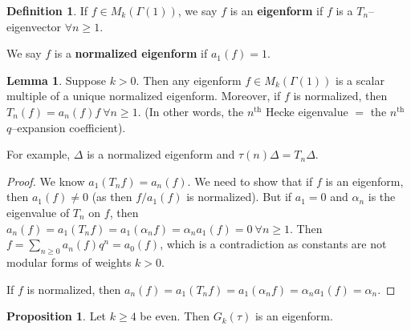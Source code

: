 \documentclass{article}
\theoremstyle{definition}
\newtheorem{lemma}[theorem]{Lemma}
\newtheorem{prop}[theorem]{Proposition}
\newtheorem{defn}{Definition}[section]
\begin{document}
\begin{defn}
    If $f \in M_k(\Gamma(1))$, we say $f$ is an \textbf{eigenform} if $f$ is a $T_n$--eigenvector $\forall n\ge 1$.
    \vspace{1mm}
     
    We say $f$ is a \textbf{normalized eigenform} if $a_1(f) = 1$.
\end{defn}
\begin{lemma}
    Suppose $k>0$. Then any eigenform $f \in M_k(\Gamma(1))$ is a scalar multiple of a unique normalized eigenform. Moreover, if $f$ is normalized, then $T_n(f) = a_n(f)f ~\forall n\ge 1$. (In other words, the $n^{\text{th}}$ Hecke eigenvalue $=$ the $n^{\text{th}}$ $q$--expansion coefficient).
\end{lemma}
For example, $\Delta$ is a normalized eigenform and $\tau(n)\Delta = T_n \Delta$.
\begin{proof}
    We know $a_1(T_n f) = a_n(f)$. We need to show that if $f$ is an eigenform, then $a_1(f) \neq 0$ (as then $f/a_1(f)$ is normalized). But if $a_1 = 0$ and $\alpha_n$ is the eigenvalue of $T_n$ on $f$, then $a_n(f) = a_1(T_n f) = a_1 (\alpha_n f) = \alpha_n a_1(f) = 0~\forall n\ge 1$. Then $f = \sum_{n\ge 0}^{} a_n(f) q^n = a_0(f)$, which is a contradiction as constants are not modular forms of weights $k>0$.
    \vspace{1mm}
     
    If $f$ is normalized, then $a_n(f) = a_1(T_n f) = a_1(\alpha_n f) = \alpha_n a_1(f) = \alpha_n$.
\end{proof}
\begin{prop}
    Let $k\ge 4$ be even. Then $G_k(\tau)$ is an eigenform.
\end{prop}
\end{document}
